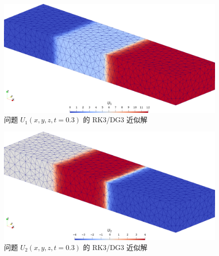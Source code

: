 \begin{figure}[h!]
\begin{centering}
\includegraphics[width=1\textwidth]{../mdpi/figures/linear_system/u_1_contour}
\par\end{centering}
\caption{\label{fig:linear_double_wave_u1}问题
$U_{1}(x,y,z,t=0.3)$ 的 RK3/DG3 近似解}
\end{figure}

\begin{figure}[h!]
\begin{centering}
\includegraphics[width=1\textwidth]{../mdpi/figures/linear_system/u_2_contour}
\par\end{centering}
\caption{\label{fig:linear_double_wave_u2}问题
$U_{2}(x,y,z,t=0.3)$ 的 RK3/DG3 近似解}
\end{figure}

